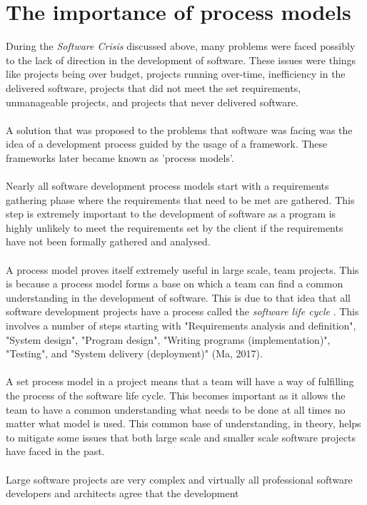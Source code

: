 \documentclass{CRPITStyle}
\begin{document}
	\section {The importance of process models}
		During the \textit {Software Crisis} discussed above, many problems were faced possibly to the lack of direction in the
		development of software. These issues were things like projects being over budget, projects running over-time,
		inefficiency in the delivered software, projects that did not meet the set requirements, unmanageable projects, and
		projects that never delivered software. \\
		~\\
		 A solution that was proposed to the problems that software was facing was the idea
		of a development process guided by the usage of a framework. These frameworks later became known as 'process
		models'. \\
		~\\
		Nearly all software development process models start with a requirements gathering phase where the requirements that
		need to be met are gathered. This step is extremely important to the development of software as a program is highly
		unlikely to meet the requirements set by the client if the requirements have not been formally gathered and analysed.\\
		~\\
		A process model proves itself extremely useful in large scale, team projects. This is because a process model forms a 
		base on which a team can find a common understanding in the development of software. This is due to that idea that all
		software development projects have a process called the \textit{ software life cycle }. This involves a number of steps
		starting with "Requirements analysis and definition", "System design", "Program design", "Writing programs 
		(implementation)", "Testing", and "System delivery (deployment)" (Ma, 2017).\\
		~\\
		A set process model in a project means that a team will have a way of fulfilling the process of the software life cycle.
		This becomes important as it allows the team to have a common understanding what needs to be done at all times no
		matter what model is used. This common base of understanding, in theory, helps to mitigate some issues that both large scale
		and smaller scale software projects have faced in the past.\\
		~\\
		Large software projects are very complex and virtually all professional software developers and architects agree that the development
\end{document}

